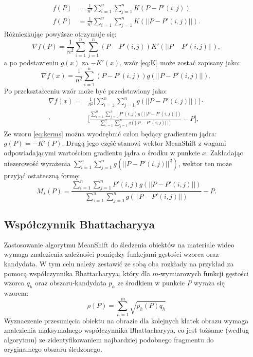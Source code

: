 \begin{equation}
\left.\begin{aligned}
f(P)&=\frac{1}{n^2}\sum_{i=1}^{n}\sum_{j=1}^{n}K(P-P'(i,j)) \\
f(P)&=\frac{1}{n^2}\sum_{i=1}^{n}\sum_{j=1}^{n}K(||P-P'(i,j)||).
\end{aligned}\right.
\end{equation}
Różniczkując powyższe otrzymuje się:
\begin{equation}
\label{eq:K}
\nabla f(P)=\frac{1}{n^2}\sum_{i=1}^{n}\sum_{j=1}^{n}(P-P'(i,j))K'(||P-P'(i,j)||),
\end{equation}
a po podstawieniu $g(x)$ za $-K'(x)$, wzór \ref{eq:K} może zostać zapisany jako:
\begin{equation}
\nabla f(x)=\frac{1}{n^2}\sum_{i=1}^{n}(P-P'(i,j))g(||P-P'(i,j)||),
\end{equation}
Po przekształceniu wzór może być przedstawiony jako:
\begin{equation}
\label{eq:kerms}
\begin{aligned}
\nabla f(x)= &\frac{1}{n^2}\bigg[\sum_{i=1}^{n}\sum_{j=1}^{n}g(||P-P'(i,j)||)\bigg] \cdot\\ \cdot&\bigg[\frac{\sum_{i=1}^{n}\sum_{j=1}^{n}P'(i,j)g(||P-P'(i,j)||)}{\sum_{i=1}^{n}\sum_{j=1}^{n}g(||P-P'(i,j)||)} -P\bigg],
\end{aligned}
\end{equation}
Ze wzoru \ref{eq:kerms} można wyodrębnić człon będący gradientem jądra: $g(P)=-K'(P)$. Drugą jego część stanowi wektor MeanShift z wagami odpowiadającymi wartościom gradientu jądra o środku w punkcie $x$. Zakładając niezerowość wyrażenia $\sum_{i=1}^{n}\sum_{j=1}^{n}g(||P-P'(i,j)||^2)$, wektor ten może przyjąć ostateczną formę:
\begin{equation}
M_s(P)=\frac{\sum_{i=1}^{n}\sum_{j=1}^{n}P'(i,j)g(||P-P'(i,j)||)}{\sum_{i=1}^{n}\sum_{j=1}^{n}g(||P-P'(i,j)||)} -P.
\end{equation}

\subsection{Współczynnik Bhattacharyya}
 \label{ssec:Bhat}
Zastosowanie algorytmu MeanShift do śledzenia obiektów na materiale
wideo wymaga znalezienia zależności pomiędzy funkcjami gęstości wzorca oraz kandydata. W tym celu należy zestawić ze sobą oba rozkłady na przykład za pomocą współczynnika Bhattacharyya, który dla $m$-wymiarowych funkcji gęstości wzorca $q_h$ oraz obszaru-kandydata $p_h$ ze środkiem w punkcie $P$ wyraża się wzorem:
\begin{equation}
\label{eq:Bhat}
\rho(P)=\sum_{h=1}^{m}\sqrt{p_h(P)q_h}
\end{equation}
Wyznaczenie przesunięcia obiektu na obrazie dla kolejnych klatek obrazu wymaga znalezienia maksymalnego współczynnika Bhattacharyya, co jest tożsame (według algorytmu) ze zidentyfikowaniem najbardziej podobnego fragmentu do oryginalnego obszaru śledzonego.

